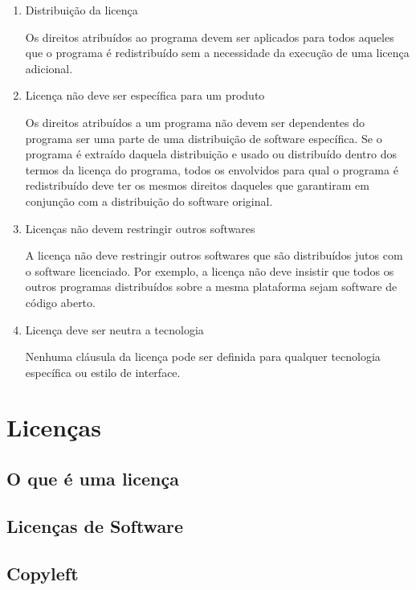 \documentclass[12pt, a4paper]{report}
\begin{document}
\begin{enumerate}
  \item{Distribuição da licença}

    Os direitos atribuídos ao programa devem ser aplicados para todos aqueles que o programa é redistribuído sem a necessidade da execução de uma licença adicional.

  \item{Licença não deve ser específica para um produto}

    Os direitos atribuídos a um programa não devem ser dependentes do programa ser uma parte de uma distribuição de software específica. Se o programa é extraído daquela distribuição e usado ou distribuído dentro dos termos da licença do programa, todos os envolvidos para qual o programa é redistribuído deve ter os mesmos direitos daqueles que garantiram em conjunção com a distribuição do software original.

  \item{Licenças não devem restringir outros softwares}

    A licença não deve restringir outros softwares que são distribuídos jutos com o software licenciado. Por exemplo, a licença não deve insistir que todos os outros programas distribuídos sobre a mesma plataforma sejam software de código aberto.

  \item{Licença deve ser neutra a tecnologia}

      Nenhuma cláusula da licença pode ser definida para qualquer tecnologia específica ou estilo de interface.

\end{enumerate}

\chapter{Licenças}

\section{O que é uma licença}

\section{Licenças de Software}

\section{Copyleft}
\end{document}
